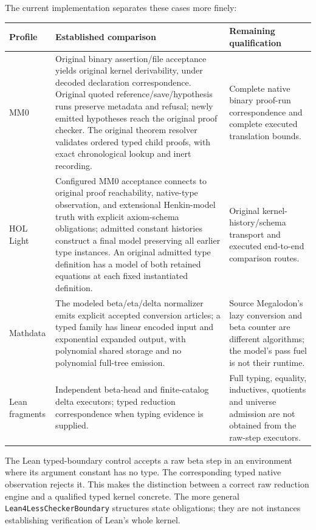 \documentclass[11pt]{article}
\newcommand{\code}[1]{\nolinkurl{#1}}
\begin{document}
The current implementation separates these cases more finely:
\begin{center}\small
\begin{tabular}{>{\raggedright\arraybackslash}p{.19\linewidth}>{\raggedright\arraybackslash}p{.37\linewidth}>{\raggedright\arraybackslash}p{.35\linewidth}}
\toprule
Profile & Established comparison & Remaining qualification\\\midrule
MM0 & Original binary assertion/file acceptance yields original kernel
  derivability, under decoded declaration correspondence. Original quoted
  reference/save/hypothesis runs preserve metadata and refusal; newly emitted
  hypotheses reach the original proof checker. The original theorem resolver
  validates ordered typed child proofs, with exact chronological lookup and
  inert recording. & Complete native binary
  proof-run correspondence and complete executed translation bounds.\\
HOL Light & Configured MM0 acceptance connects to original proof reachability,
  native-type observation, and extensional Henkin-model truth with explicit
  axiom-schema obligations; admitted constant histories construct a final
  model preserving all earlier type instances. An original admitted type
  definition has a model of both retained equations at each fixed
  instantiated definition. & Original kernel-history/schema transport and executed
  end-to-end comparison routes.\\
Mathdata & The modeled beta/eta/delta normalizer emits explicit accepted
  conversion articles; a typed family has linear encoded input and exponential
  expanded output, with polynomial shared storage and no polynomial
  full-tree emission. & Source Megalodon's lazy conversion and beta counter
  are different algorithms; the model's pass fuel is not their runtime.\\
Lean fragments & Independent beta-head and finite-catalog delta executors;
  typed reduction correspondence when typing evidence is supplied. & Full
  typing, equality, inductives, quotients and universe admission are not
  obtained from the raw-step executors.\\
\bottomrule
\end{tabular}
\end{center}
The Lean typed-boundary control accepts a raw beta step in an environment
where its argument constant has no type. The corresponding typed native
observation rejects it. This makes the distinction between a correct raw
reduction engine and a qualified typed kernel concrete. The more general
\code{Lean4LessCheckerBoundary} structures state obligations; they are not
instances establishing verification of Lean's whole kernel.
\end{document}
